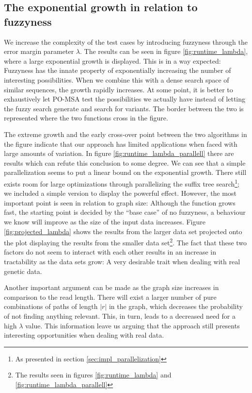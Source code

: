 \documentclass[thesis.tex]{subfiles}
\begin{document}
\subsection*{The exponential growth in relation to fuzzyness}
We increase the complexity of the test cases by introducing fuzzyness through the error margin parameter $\lambda$. The results can be seen in figure \ref{fig:runtime_lambda}, where a large exponential growth is displayed. This is in a way expected: Fuzzyness has the innate property of exponentially increasing the number of interesting possibilities. When we combine this with a dense search space of similar sequences, the growth rapidly increases. At some point, it is better to exhaustively let PO-MSA test the possibilities we actually have instead of letting the fuzzy search generate and search for variants. The border between the two is represented where the two functions cross in the figure.\\
\par\noindent
The extreme growth and the early cross-over point between the two algorithms in the figure indicate that our approach has limited applications when faced with large amounts of variation. In figure \ref{fig:runtime_lambda_parallell} there are results which can refute this conclusion to some degree. We can see that a simple parallelization seems to put a linear bound on the exponential growth. There still exists room for large optimizations through parallelizing the suffix tree search\footnote{As presented in section \ref{sec:impl_parallelization}}; we included a simple version to display the powerful effect. However, the most important point is seen in relation to graph size: Although the function grows fast, the starting point is decided by the ``base case'' of no fuzzyness, a behaviour we know will improve as the size of the input data increases. Figure \ref{fig:projected_lambda} shows the results from the larger data set projected onto the plot displaying the results from the smaller data set\footnote{The results seen in figures \ref{fig:runtime_lambda} and \ref{fig:runtime_lambda_parallell}}. The fact that these two factors do not seem to interact with each other results in an increase in tractability as the data sets grow: A very desirable trait when dealing with real genetic data. \\
\par\noindent
Another important argument can be made as the graph size increases in comparison to the read length. There will exist a larger number of pure combinations of paths of length $|r|$ in the graph, which decreases the probability of not finding anything relevant. This, in turn, leads to a decreased need for a high $\lambda$ value. This information leave us arguing that the approach still presents interesting opportunities when dealing with real data.
\end{document}

